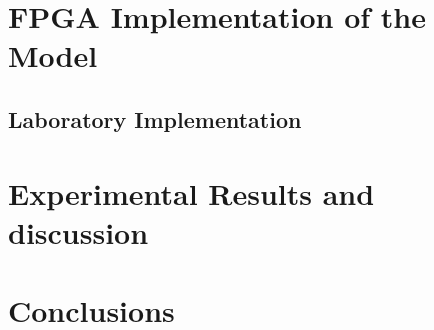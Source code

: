 \documentclass{article}
\begin{document}

\section{FPGA Implementation of the Model}
\subsection{Laboratory Implementation}




\section{Experimental Results and discussion}





\section{Conclusions}






\end{document}
